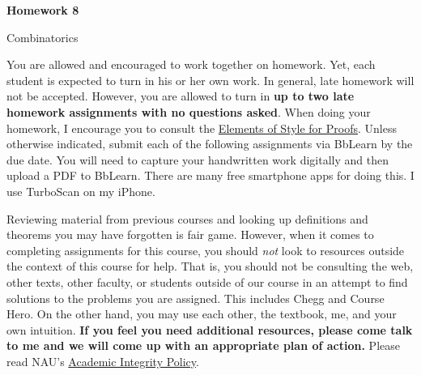 \documentclass[11pt]{article}%
\theoremstyle{definition}
\newcommand{\blankline}{\pagebreak[2]\vspace{.5\baselineskip}}
\begin{document}
\begin{center}
{\Large\bf Homework 8}

\smallskip

Combinatorics
\end{center}

\thispagestyle{fancy}

You are allowed and encouraged to work together on homework. Yet, each student is expected to turn in his or her own work. In general, late homework will not be accepted. However, you are allowed to turn in \textbf{up to two late homework assignments with no questions asked}. When doing your homework, I encourage you to consult the \href{http://danaernst.com/teaching/ElementsOfStyle.pdf}{Elements of Style for Proofs}. Unless otherwise indicated, submit each of the following assignments via BbLearn by the due date. You will need to capture your handwritten work digitally and then upload a PDF to BbLearn. There are many free smartphone apps for doing this. I use TurboScan on my iPhone.

\blankline

Reviewing material from previous courses and looking up definitions and theorems you may have forgotten is fair game. However, when it comes to completing assignments for this course, you should \emph{not} look to resources outside the context of this course for help.  That is, you should not be consulting the web, other texts, other faculty, or students outside of our course in an attempt to find solutions to the problems you are assigned.  This includes Chegg and Course Hero. On the other hand, you may use each other, the textbook, me, and your own intuition. \textbf{If you feel you need additional resources, please come talk to me and we will come up with an appropriate plan of action.} Please read NAU's \href{https://www5.nau.edu/policies/Client/Details/828?whoIsLooking=Students&pertainsTo=All&sortDirection=Ascending&page=1}{Academic Integrity Policy}.

\blankline
\end{document}
